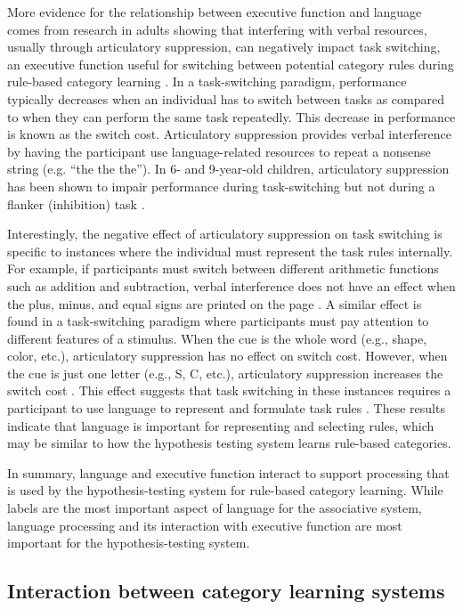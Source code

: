 \documentclass[../dissertation.tex]{subfiles}
\begin{document}
	More evidence for the relationship between executive function and language comes from research in adults showing that interfering with verbal resources, usually through articulatory suppression, can negatively impact task switching, an executive function useful for switching between potential category rules during rule-based category learning \citep{Baddeley2001,Emerson2003}. In a task-switching paradigm, performance typically decreases when an individual has to switch between tasks as compared to when they can perform the same task repeatedly. This decrease in performance is known as the switch cost. Articulatory suppression provides verbal interference by having the participant use language-related resources to repeat a nonsense string (e.g. “the the the”). In 6- and 9-year-old children, articulatory suppression has been shown to impair performance during task-switching but not during a flanker (inhibition) task \citep{Fatzer2012}. \par
	Interestingly, the negative effect of articulatory suppression on task switching is specific to instances where the individual must represent the task rules internally. For example, if participants must switch between different arithmetic functions such as addition and subtraction, verbal interference does not have an effect when the plus, minus, and equal signs are printed on the page \citep{Baddeley2001}. A similar effect is found in a task-switching paradigm where participants must pay attention to different features of a stimulus. When the cue is the whole word (e.g., shape, color, etc.), articulatory suppression has no effect on switch cost. However, when the cue is just one letter (e.g., S, C, etc.), articulatory suppression increases the switch cost \citep{Miyake2004}. This effect suggests that task switching in these instances requires a participant to use language to represent and formulate task rules \citep{Cragg2010}. These results indicate that language is important for representing and selecting rules, which may be similar to how the hypothesis testing system learns rule-based categories. \par
	 In summary, language and executive function interact to support processing that is used by the hypothesis-testing system for rule-based category learning. While labels are the most important aspect of language for the associative system, language processing and its interaction with executive function are most important for the hypothesis-testing system.
	
\subsection{Interaction between category learning systems}\label{order_intro}
\end{document}
